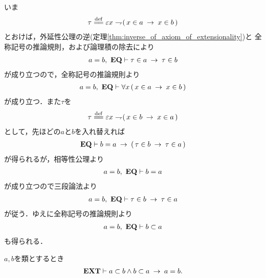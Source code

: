 	\begin{sketch}
		いま
		\begin{align}
			\tau \defeq \varepsilon x \negation (\, x \in a \rarrow x \in b\, )
		\end{align}
		とおけば，外延性公理の逆(定理\ref{thm:inverse_of_axiom_of_extensionality})と
		全称記号の推論規則，および論理積の除去により
		\begin{align}
			a = b,\ \mbox{{\bf EQ}} \vdash \tau \in a \hspace{0.25em}\rightarrow\hspace{0.25em} \tau \in b
		\end{align}
		が成り立つので，全称記号の推論規則より
		\begin{align}
			a = b,\ \mbox{{\bf EQ}} \vdash \forall x\, (\, x \in a \hspace{0.25em}\rightarrow\hspace{0.25em} x \in b\, )
		\end{align}
		が成り立つ．また$\tau$を
		\begin{align}
			\tau \defeq \varepsilon x \negation (\, x \in b \rarrow x \in a\, )
		\end{align}
		として，先ほどの$a$と$b$を入れ替えれば
		\begin{align}
			\mbox{{\bf EQ}} \vdash b = a \hspace{0.25em}\rightarrow\hspace{0.25em} (\, \tau \in b \hspace{0.25em}\rightarrow\hspace{0.25em} \tau \in a\, )
		\end{align}
		が得られるが，相等性公理より
		\begin{align}
			a = b,\ \mbox{{\bf EQ}} \vdash b = a
		\end{align}
		が成り立つので三段論法より
		\begin{align}
			a = b,\ \mbox{{\bf EQ}} \vdash \tau \in b \hspace{0.25em}\rightarrow\hspace{0.25em} \tau \in a
		\end{align}
		が従う．ゆえに全称記号の推論規則より
		\begin{align}
			a = b,\ \mbox{{\bf EQ}} \vdash b \subset a
		\end{align}
		も得られる．
		\QED
	\end{sketch}
	
	\begin{screen}
		\begin{thm}[互いに相手を包含する類同士は等しい]
		\label{thm:mutually_including_classes_are_equivalent}
			$a,b$を類とするとき
			\begin{align}
				\mbox{{\bf EXT}} \vdash a \subset b \wedge b \subset a \hspace{0.25em}\rightarrow\hspace{0.25em} a = b.
			\end{align}
		\end{thm}
	\end{screen}
	
